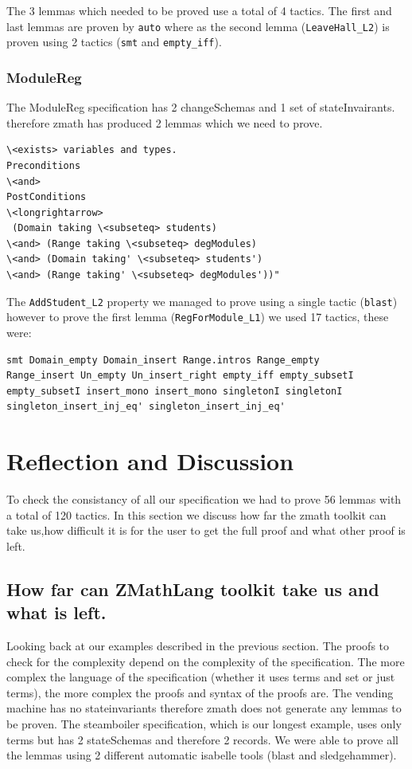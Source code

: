 The 3 lemmas which needed to be proved use a total of 4 tactics. The first and last lemmas are proven by \verb|auto| where as the second lemma (\verb|LeaveHall_L2|) is proven using 2 tactics (\verb|smt| and \verb|empty_iff|).

\subsubsection{ModuleReg}

The ModuleReg specification has 2 changeSchemas and 1 set of stateInvairants. therefore \gls{zmath} has produced 2 lemmas which we need to prove.

\begin{verbatim}
\<exists> variables and types.
Preconditions
\<and>
PostConditions
\<longrightarrow>
 (Domain taking \<subseteq> students)
\<and> (Range taking \<subseteq> degModules)
\<and> (Domain taking' \<subseteq> students')
\<and> (Range taking' \<subseteq> degModules'))"
\end{verbatim}

The \verb|AddStudent_L2| property we managed to prove using a single tactic (\verb|blast|) however to prove the first lemma (\verb|RegForModule_L1|) we used 17 tactics, these were:

\begin{verbatim}
smt Domain_empty Domain_insert Range.intros Range_empty 
Range_insert Un_empty Un_insert_right empty_iff empty_subsetI 
empty_subsetI insert_mono insert_mono singletonI singletonI 
singleton_insert_inj_eq' singleton_insert_inj_eq'
\end{verbatim}

\section{Reflection and Discussion}

To check the consistancy of all our specification we had to prove 56 lemmas with a total of 120 tactics. In this section we discuss how far the \gls{zmath} toolkit can take us,how difficult it is for the user to get the full proof and what other proof is left.

\subsection{How far can ZMathLang toolkit take us and what is left.}

Looking back at our examples described in the previous section. The proofs to check for the complexity depend on the complexity of the specification. The more complex the language of the specification (whether it uses terms and set or just terms), the more complex the proofs and syntax of the proofs are. The vending machine has no stateinvariants therefore \gls{zmath} does not generate any lemmas to be proven. The steamboiler specification, which is our longest example, uses only terms but has 2 stateSchemas and therefore 2 records. We were able to prove all the lemmas using 2 different automatic isabelle tools (blast and sledgehammer).


